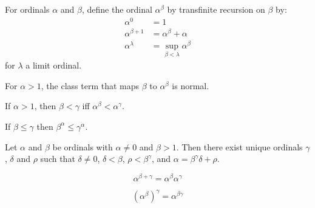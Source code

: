 \begin{definition}[Exponentiation]
    For ordinals $\alpha$ and $\beta$, define the ordinal $\alpha^\beta$
    by transfinite recursion on $\beta$ by:
    \begin{align*}
        \alpha^0 & = 1 \\
        \alpha^{\beta + 1} & = \alpha^\beta + \alpha \\
        \alpha^\lambda & = \sup_{\beta < \lambda} \alpha^\beta
    \end{align*}
    for $\lambda$ a limit ordinal.
\end{definition}

\begin{theorem}
    For $\alpha > 1$, the class term that maps $\beta$ to $\alpha^\beta$ is normal.
\end{theorem}

\begin{theorem}
    If $\alpha > 1$, then $\beta < \gamma$ iff $\alpha^\beta < \alpha^\gamma$.
\end{theorem}

\begin{theorem}
    If $\beta \leq \gamma$ then $\beta^\alpha \leq \gamma^\alpha$.
\end{theorem}

\begin{theorem}
    Let $\alpha$ and $\beta$ be ordinals with $\alpha \neq 0$
    and $\beta > 1$. Then there exist unique ordinals $\gamma$,
    $\delta$ and $\rho$ such that $\delta \neq 0$, $\delta < \beta$,
    $\rho < \beta^\gamma$, and $\alpha = \beta^\gamma \delta + \rho$.
\end{theorem}

\begin{theorem}
    \[ \alpha^{\beta + \gamma} = \alpha^\beta \alpha^\gamma \]
\end{theorem}

\begin{theorem}
    \[ (\alpha^\beta)^\gamma = \alpha^{\beta \gamma} \]
\end{theorem}